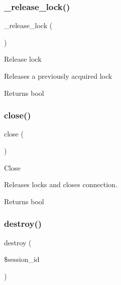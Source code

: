 \subsubsection{\texorpdfstring{\+\_\+release\+\_\+lock()}{\_release\_lock()}}
{\footnotesize\ttfamily \+\_\+release\+\_\+lock (\begin{DoxyParamCaption}{ }\end{DoxyParamCaption})\hspace{0.3cm}{\ttfamily [protected]}}

Release lock

Releases a previously acquired lock

\begin{DoxyReturn}{Returns}
bool 
\end{DoxyReturn}
\mbox{\label{class_c_i___session__memcached__driver_aa69c8bf1f1dcf4e72552efff1fe3e87e}} 
\subsubsection{\texorpdfstring{close()}{close()}}
{\footnotesize\ttfamily close (\begin{DoxyParamCaption}{ }\end{DoxyParamCaption})}

Close

Releases locks and closes connection.

\begin{DoxyReturn}{Returns}
bool 
\end{DoxyReturn}
\mbox{\label{class_c_i___session__memcached__driver_aaec5812f6b4eb6835f88d3baa06a002a}} 
\subsubsection{\texorpdfstring{destroy()}{destroy()}}
{\footnotesize\ttfamily destroy (\begin{DoxyParamCaption}\item[{}]{\$session\+\_\+id }\end{DoxyParamCaption})}

